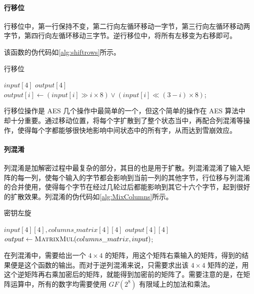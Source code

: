 \documentclass[a4paper, zihao=-4, UTF-8]{ctexart}
\begin{document}
	\paragraph{行移位} 行移位中，第一行保持不变，第二行向左循环移动一字节，第三行向左循环移动两字节，第四行向左循环移动三字节。逆行移位中，将所有左移变为右移即可。
	
	该函数的伪代码如\cref{alg:shiftrows}所示。
	
	\begin{algorithm}[htbp]
		\caption{行移位}
		\label{alg:shiftrows}
		\begin{algorithmic}[1]
			\Require $input[4]$
			\Ensure $output[4]$
				\State $output[i]\gets (input[i] \gg i \times 8) \vee (input[i] \ll (3 − i) \times 8)$;
			\EndFor
			\State {}
			\EndFunction
		\end{algorithmic}
	\end{algorithm}

	行移位操作是 AES 几个操作中最简单的一个，但这个简单的操作在 AES 算法中却十分重要。通过移动位置，将每个字扩散到了整个状态当中，再配合列混淆等操作，使得每个字都能够很快地影响中间状态中的所有字，从而达到雪崩效应。
	
	\paragraph{列混淆} 列混淆是加解密过程中最复杂的部分，其目的也是用于扩散。列混淆混淆了输入矩阵的每一列，使每个输入的字节都会影响到当前一列的其他字节，行位移与列混淆的合并使用，使得每个字节在经过几轮过后都能影响到其它十六个字节，起到很好的扩散效果。列混淆的伪代码如\cref{alg:MixColumns}所示。
	
	\begin{algorithm}[htbp]
		\caption{密钥左旋}
		\label{alg:MixColumns}
		\begin{algorithmic}[1]
			\Require $input[4][4], columns\_matrix[4][4]$
			\Ensure $output[4][4]$
			\State $output \gets \Call{MatrixMul}{columns\_matrix, input}$;
			\State {}
			\EndFunction
		\end{algorithmic}
	\end{algorithm}
	
	在列混淆中，需要给出一个 $4 \times 4$ 的矩阵，用这个矩阵右乘输入的矩阵，得到的结果便是这个函数的输出。而对于逆列混淆来说，只需要求出该 $4 \times 4$ 矩阵的逆，用这个逆矩阵再右乘加密后的矩阵，就能得到加密前的矩阵了。需要注意的是，在矩阵运算中，所有的数字均需要使用 $GF(2^8)$ 有限域上的加法和乘法。
\end{document}
